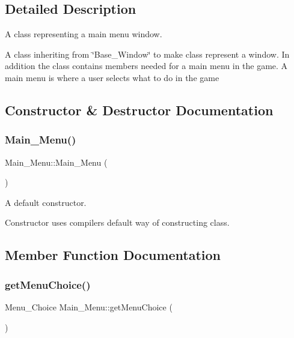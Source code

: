 \subsection{Detailed Description}
A class representing a main menu window. 

A class inheriting from \char`\"{}\+Base\+\_\+\+Window\char`\"{} to make class represent a window. In addition the class contains members needed for a main menu in the game. A main menu is where a user selects what to do in the game 

\subsection{Constructor \& Destructor Documentation}
\mbox{\label{classMain__Menu_a1f1fce181168ba08a7c2debe7e5333ef}} 
\subsubsection{\texorpdfstring{Main\+\_\+\+Menu()}{Main\_Menu()}}
{\footnotesize\ttfamily Main\+\_\+\+Menu\+::\+Main\+\_\+\+Menu (\begin{DoxyParamCaption}{ }\end{DoxyParamCaption})\hspace{0.3cm}{\ttfamily [default]}}



A default constructor. 

Constructor uses compiler\textquotesingle{}s default way of constructing class. 

\subsection{Member Function Documentation}
\mbox{\label{classMain__Menu_a33b9a75fcda233154f81ed32f8f724d9}} 
\subsubsection{\texorpdfstring{get\+Menu\+Choice()}{getMenuChoice()}}
{\footnotesize\ttfamily Menu\+\_\+\+Choice Main\+\_\+\+Menu\+::get\+Menu\+Choice (\begin{DoxyParamCaption}{ }\end{DoxyParamCaption})}



